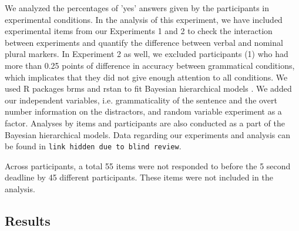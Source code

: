 \documentclass[doc,a4paper,man,natbib,floatsintext,noextraspace]{apa6}\usepackage[]{graphicx}\usepackage[]{color}
\begin{document}
We analyzed the percentages of 'yes' answers given by the participants in experimental conditions. In the analysis of this experiment, we have included experimental items from our Experiments 1 and 2 to check the interaction between experiments and quantify the difference between verbal and nominal plural markers. In Experiment 2 as well, we excluded participants (1) who had more than 0.25 points of difference in accuracy between grammatical conditions, which implicates that they did not give enough attention to all conditions. We used R packages brms \citep{R-brms_b} and rstan \citep{R-stan} to fit Bayesian hierarchical models \citep{GelmanHill:2007}. We added our independent variables, i.e. grammaticality of the sentence and the overt number information on the distractors, and random variable experiment as a factor. Analyses by items and participants are also conducted as a 
part of the Bayesian hierarchical models. Data regarding our experiments and analysis can be found in \texttt{link hidden due to blind review}.

Across participants, a total 55 items were not responded to before the 5 second deadline by 45 different participants. These items were not included in the analysis. 


\subsection{Results} \label{sec:exp2:results}
\end{document}
